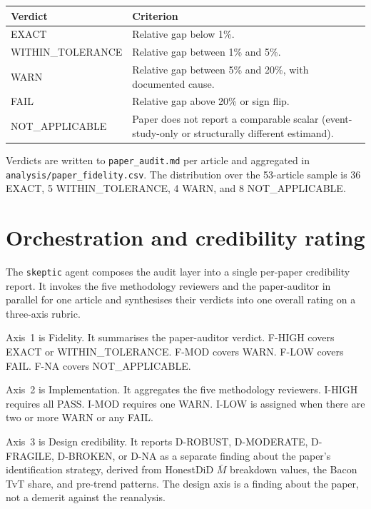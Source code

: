 \begin{table}[H]
\centering
\footnotesize
\begin{tabularx}{\textwidth}{@{}l X@{}}
\toprule
\textbf{Verdict} & \textbf{Criterion} \\
\midrule
EXACT             & Relative gap below 1\%. \\
WITHIN\_TOLERANCE & Relative gap between 1\% and 5\%. \\
WARN              & Relative gap between 5\% and 20\%, with documented cause. \\
FAIL              & Relative gap above 20\% or sign flip. \\
NOT\_APPLICABLE   & Paper does not report a comparable scalar (event-study-only or structurally different estimand). \\
\bottomrule
\end{tabularx}
\end{table}

Verdicts are written to \texttt{paper\_audit.md} per article and aggregated in \texttt{analysis/paper\_fidelity.csv}. The distribution over the 53-article sample is 36 EXACT, 5 WITHIN\_TOLERANCE, 4 WARN, and 8 NOT\_APPLICABLE.


\section{Orchestration and credibility rating}
\label{sec:appc_skeptic}

The \texttt{skeptic} agent composes the audit layer into a single per-paper credibility report. It invokes the five methodology reviewers and the paper-auditor in parallel for one article and synthesises their verdicts into one overall rating on a three-axis rubric.

Axis~1 is Fidelity. It summarises the paper-auditor verdict. F-HIGH covers EXACT or WITHIN\_TOLERANCE. F-MOD covers WARN. F-LOW covers FAIL. F-NA covers NOT\_APPLICABLE.

Axis~2 is Implementation. It aggregates the five methodology reviewers. I-HIGH requires all PASS. I-MOD requires one WARN. I-LOW is assigned when there are two or more WARN or any FAIL.

Axis~3 is Design credibility. It reports D-ROBUST, D-MODERATE, D-FRAGILE, D-BROKEN, or D-NA as a separate finding about the paper's identification strategy, derived from HonestDiD $\bar M$ breakdown values, the Bacon TvT share, and pre-trend patterns. The design axis is a finding about the paper, not a demerit against the reanalysis.

